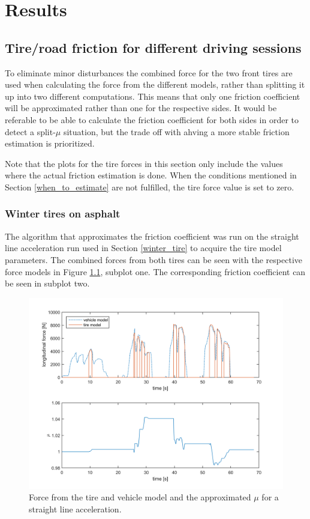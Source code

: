 \chapter{Results}

\section{Tire/road friction for different driving sessions}

To eliminate minor disturbances the combined force for the two front tires are used when calculating the force from the different models, rather than splitting it up into two different computations. This means that only one friction coefficient will be approximated rather than one for the respective sides. It would be referable to be able to calculate the friction coefficient for both sides in order to detect a split-$ \mu $ situation, but the trade off with ahving a more stable friction estimation is prioritized.

Note that the plots for the tire forces in this section only include the values where the actual friction estimation is done. When the conditions mentioned in Section \ref{when_to_estimate} are not fulfilled, the tire force value is set to zero. 


\subsection{Winter tires on asphalt}
The algorithm that approximates the friction coefficient was run on the straight line acceleration run used in Section \ref{winter_tire} to acquire the tire model parameters. The combined forces from both tires can be seen with the respective force models in Figure \ref{force_mue_olika_acc}, subplot one. The corresponding friction coefficient can be seen in subplot two. 

\begin{figure}[h]
	\centering
	\includegraphics[width=1.0\textwidth]{Pictures/force_mue_olika_acc}
	\caption {Force from the tire and vehicle model and the approximated $ \mu $ for a straight line acceleration.}
	\label{force_mue_olika_acc}
\end{figure}

